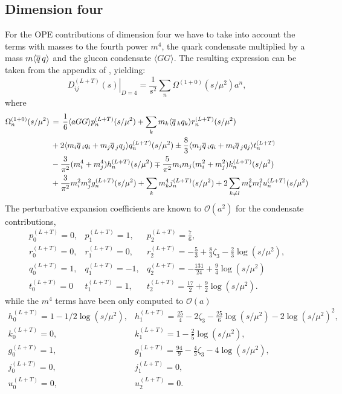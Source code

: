 \documentclass[../../index.tex]{subfiles}
\begin{document}
\subsection{Dimension four}
For the OPE contributions of dimension four we have to take into account the
terms with masses to the fourth power $m^4$, the quark condensate multiplied by
a mass $m \langle \overline{q}\, q \rangle$ and the glucon condensate $\langle GG
\rangle$. The resulting expression can be taken from the appendix of
\cite{Pich1999}, yielding:
\begin{equation}
  \left. D_{ij}^{(L+T)}(s) \right\rvert_{D=4} = \frac{1}{s^2} \sum_n \Omega^{(1+0)}(s/\mu^2)a^n,
\end{equation}
where
\begin{equation}
  \begin{split}
    \Omega_n^{(1+0)} (s/\mu^2) &\,=\, \frac{1}{6}\langle aGG \rangle p_n^{(L+T)}(s/\mu^2) + \sum_k m_k \langle \overline{q}\,_k q_k \rangle r_n^{(L+T)}(s/\mu^2) \\
    &\,+ 2\langle m_i \overline{q}\,_i q_i + m_j \overline{q}\,_j q_j \rangle q_n^{(L+T)} (s/\mu^2) \pm \frac{8}{3} \langle m_j \overline{q}\,_i q_i + m_i \overline{q}\,_j q_j \rangle t_n^{(L+T)} \\
    &\,- \frac{3}{\pi^2} (m_i^4 + m_j^4) h_n^{(L+T)} (s/\mu^2) \mp \frac{5}{\pi^2} m_i m_j (m_i^2 + m_j^2) k_n^{(L+T)}(s/\mu^2)\\
    &\,+ \frac{3}{\pi^2} m_i^2 m_j^2 g_n^{(L+T)}(s/\mu^2) + \sum_k m_k^4 j_n^{(L+T)}(s/\mu^2) + 2 \sum_{k \neq l} m_k^2 m_l^2 u_n^{(L+T)}(s/\mu^2)
  \end{split}
\end{equation}
The perturbative expansion coefficients are known to $\mathcal{O}(a^2)$ for the
condensate contributions,
\begin{equation}
  \begin{array}{lll}
    p_0^{(L+T)}=0, & p_1^{(L+T)}=1, & p_2^{(L+T)}=\frac{7}{6}, \\
    r_0^{(L+T)}=0, & r_1^{(L+T)}=0, & r_2^{(L+T)}=-\frac{5}{3}+\frac{8}{3}\zeta_3-\frac{2}{3}\log(s/\mu^2), \\
    q_0^{(L+T)}=1, & q_1^{(L+T)}=-1, & q_2^{(L+T)}=-\frac{131}{24}+\frac{9}{4}\log(s/\mu^2) \\
    t_0^{(L+T)}=0 & t_1^{(L+T)}=1, & t_2^{(L+T)}=\frac{17}{2}+\frac{9}{2}\log(s/\mu^2).
  \end{array}
\end{equation}
while the $m^4$ terms have been only computed to $\mathcal{O}(a)$
\begin{equation}
  \begin{array}{lll}
    h_0^{(L+T)}=1-1/2 \log(s/\mu^2), & h_1^{(L+T)}=\frac{25}{4}-2\zeta_3-\frac{25}{6}\log(s/\mu^2)-2 \log(s/\mu^2)^2, \\
    k_0^{(L+T)}=0, & k_1^{(L+T)}=1-\frac{2}{5}\log(s/\mu^2), \\
    g_0^{(L+T)}=1, & g_1^{(L+T)}=\frac{94}{9}-\frac{4}{3}\zeta_3-4 \log(s/\mu^2), \\
    j_0^{(L+T)}=0, & j_1^{(L+T)}=0, \\
    u_0^{(L+T)}=0, & u_2^{(L+T)}=0.
  \end{array}
\end{equation}
\end{document}
